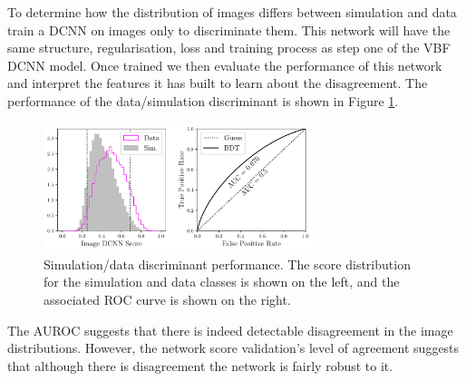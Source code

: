 To determine how the distribution of images differs between simulation and data train a DCNN on images only to discriminate them. 
This network will have the same structure, regularisation, loss and training process as step one of the VBF DCNN model. 
Once trained we then evaluate the performance of this network and interpret the features it has built to learn about the disagreement.  
The performance of the data/simulation discriminant is shown in Figure \ref{fig:event_categorisation:zee_disc_perf}.
\begin{figure}[h!]
    \includegraphics[width=0.7\textwidth]{figures/event_selection/ROC_Zee_img_DCNN.pdf}
    \caption{\Zee Simulation/data discriminant performance. The score distribution for the simulation and data classes is shown on the left, and the associated ROC curve is shown on the right.} 
    \label{fig:event_categorisation:zee_disc_perf}
\end{figure}

The AUROC suggests that there is indeed detectable disagreement in the image distributions. 
However, the network score validation's level of agreement suggests that although there is disagreement the network is fairly robust to it. 

